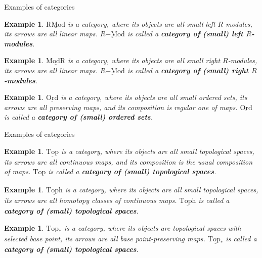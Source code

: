 \documentclass[dvipdfmx,10pt,notheorems]{beamer}
\newtheorem{example}[theorem]{Example}
\renewcommand{\#}{^\sharp}
\begin{document}
	\begin{frame}{Examples of categories}
			\begin{example}
			$\underline{\mathrm{RMod}}$ is a category, where its objects are all small left $R$-modules,
			its arrows are all linear maps.
			$\underline{R\mathrm{-Mod}}$ is called a {\bf category of (small) left $R$-modules}.
			\end{example}
			\begin{example}
			$\underline{\mathrm{ModR}}$ is a category, where its objects are all small right $R$-modules,
			its arrows are all linear maps.
			$\underline{R\mathrm{-Mod}}$ is called a {\bf category of (small) right $R$-modules}.
			\end{example}
			\begin{example}
			$\underline{\mathrm{Ord}}$ is a category, where its objects are all small ordered sets,
			its arrows are all preserving maps,
			and its composition is regular one of maps.
			$\underline{\mathrm{Ord}}$ is called a {\bf category of (small) ordered sets}.
			\end{example}
	\end{frame}
	
	
	\begin{frame}{Examples of categories}
			\begin{example}
			$\underline{\mathrm{Top}}$ is a category, where its objects are all small topological spaces,
			its arrows are all continuous maps,
			and its composition is the usual composition of maps.
			$\underline{\mathrm{Top}}$ is called a {\bf category of (small) topological spaces}.
			\end{example}
			\begin{example}
			$\underline{\mathrm{Toph}}$ is a category, where its objects are all small topological spaces,
			its arrows are all homotopy classes of continuous maps.
			$\underline{\mathrm{Toph}}$ is called a {\bf category of (small) topological spaces}.
			\end{example}
			\begin{example}
			$\underline{\mathrm{Top}_*}$ is a category, where its objects are topological spaces with selected base point,
			its arrows are all base point-preserving maps.
			$\underline{\mathrm{Top}_*}$ is called a {\bf category of (small) topological spaces}.
			\end{example}
	\end{frame}

	
	
\end{document}
